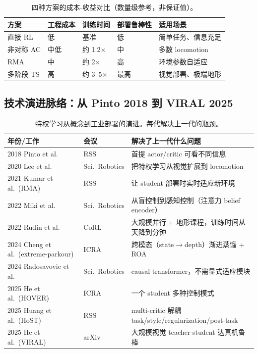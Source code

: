 \begin{table}[H]
\centering
\small
\caption{四种方案的成本-收益对比（数量级参考，非保证值）。}
\label{tab:rlmc-priv-costbenefit}
\begin{tabular}{@{}lllll@{}}
\toprule
方案 & 工程成本 & 训练时间 & 部署鲁棒性 & 适用场景 \\
\midrule
直接 RL & 低 & 基准 & 低 & 简单任务、信息充足 \\
非对称 AC & 中低 & 约 1.2$\times$ & 中 & 多数 locomotion \\
RMA & 中 & 约 2$\times$ & 高 & 环境参数自适应 \\
多阶段 TS & 高 & 约 3--5$\times$ & 最高 & 视觉部署、极端地形 \\
\bottomrule
\end{tabular}
\end{table}


\subsection{技术演进脉络：从 Pinto 2018 到 VIRAL 2025}
\label{sec:rlmc-priv-evolution}

\begin{table}[H]
\centering
\small
\caption{特权学习从概念到工业部署的演进。每代解决上一代的瓶颈。}
\label{tab:rlmc-priv-timeline}
\begin{tabular}{@{}llp{6.0cm}@{}}
\toprule
年份/工作 & 会议 & 解决了上一代什么问题 \\
\midrule
2018 Pinto et al. & RSS & 首提 actor/critic 可看不同信息 \\
2020 Lee et al. & Sci.\ Robotics & 把特权学习从视觉扩展到 locomotion \\
2021 Kumar et al.\ (RMA) & RSS & 让 student 部署时实时适应新环境 \\
2022 Miki et al. & Sci.\ Robotics & 从盲控制到感知控制（注意力 belief encoder） \\
2022 Rudin et al. & CoRL & 大规模并行 + 地形课程，训练时间从天降到分钟 \\
2024 Cheng et al.\ (extreme-parkour) & ICRA & 跨模态（state$\to$depth）渐进蒸馏 + ROA \\
2024 Radosavovic et al. & Sci.\ Robotics & causal transformer，不需显式适应模块 \\
2025 He et al.\ (HOVER) & ICRA & 一个 student 多种控制模式 \\
2025 Huang et al.\ (HoST) & RSS & multi-critic 解耦 task/style/regularization/post-task \\
2025 He et al.\ (VIRAL) & arXiv & 大规模视觉 teacher-student 达真机鲁棒 \\
\bottomrule
\end{tabular}
\end{table}

